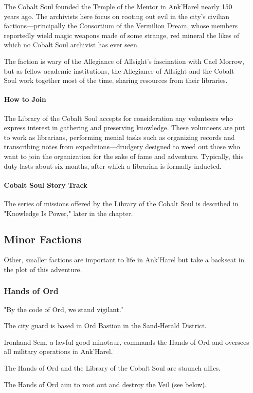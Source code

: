 \documentclass[10pt,a4paper,twoside,bg=print,twocolumn,openany,nodeprecatedcode]{dndbook}
\begin{document}
The Cobalt Soul founded the Temple of the Mentor in Ank'Harel nearly 150 years ago. The archivists here focus on rooting out evil in the city's civilian factions—principally the Consortium of the Vermilion Dream, whose members reportedly wield magic weapons made of some strange, red mineral the likes of which no Cobalt Soul archivist has ever seen.

The faction is wary of the Allegiance of Allsight's fascination with Cael Morrow, but as fellow academic institutions, the Allegiance of Allsight and the Cobalt Soul work together most of the time, sharing resources from their libraries.

\paragraph{How to Join}
The Library of the Cobalt Soul accepts for consideration any volunteers who express interest in gathering and preserving knowledge. These volunteers are put to work as librarians, performing menial tasks such as organizing records and transcribing notes from expeditions—drudgery designed to weed out those who want to join the organization for the sake of fame and adventure. Typically, this duty lasts about six months, after which a librarian is formally inducted.

\paragraph{Cobalt Soul Story Track}
The series of missions offered by the Library of the Cobalt Soul is described in "Knowledge Is Power," later in the chapter.

\subsection{Minor Factions}
Other, smaller factions are important to life in Ank'Harel but take a backseat in the plot of this adventure.

\subsubsection{Hands of Ord}
"By the code of Ord, we stand vigilant."


\begin{description}[nolistsep]
\item[Headquarters.]
The city guard is based in Ord Bastion in the Sand-Herald District.
\item[Leader.]
Ironhand Sem, a lawful good minotaur, commands the Hands of Ord and oversees all military operations in Ank'Harel.
\item[Allies.]
The Hands of Ord and the Library of the Cobalt Soul are staunch allies.
\item[Opponents.]
The Hands of Ord aim to root out and destroy the Veil (see below).
\end{description}
\end{document}
